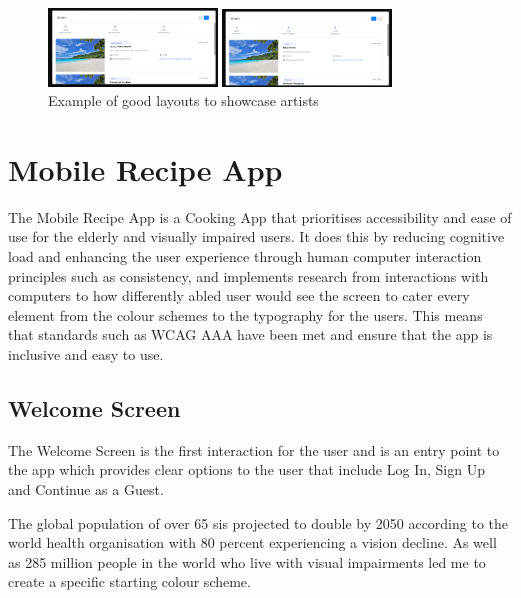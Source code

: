 \documentclass[]{project_final}
\begin{document}
\begin{figure}[ht!]
  \centering
  \begin{minipage}[t]{0.4\textwidth}
    \includegraphics[width=0.4\textwidth]{itin2.png}
  \end{minipage}
  \hfill
  \begin{minipage}[t]{0.4\textwidth}
    \includegraphics[width=0.4\textwidth]{itin3.png}
  \end{minipage}
  \caption{Example of good layouts to showcase artists}
  \label{fig:1}
\end{figure}


\newpage




\section{Mobile Recipe App}
The Mobile Recipe App is a Cooking App that prioritises accessibility and ease of use for the elderly and visually impaired users. It does this by reducing cognitive load and enhancing the user experience through human computer interaction principles such as consistency, and implements research from interactions with computers to how differently abled user would see the screen to cater every element from the colour schemes to the typography for the users. This means that standards such as WCAG AAA have been met and ensure that the app is inclusive and easy to use.

\subsection{Welcome Screen}
The Welcome Screen is the first interaction for the user and is an entry point to the app which provides clear options to the user that include Log In, Sign Up and Continue as a Guest.

The global population of over 65 sis projected to double by 2050 according to the world health organisation with 80 percent experiencing a vision decline. As well as 285 million people in the world who live with visual impairments led me to create a specific starting colour scheme.
\end{document}
